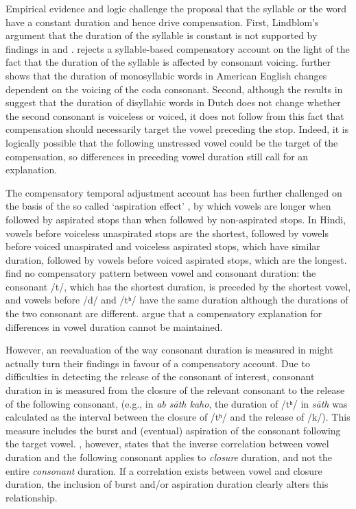 \documentclass[preprint]{JASAnew}
\begin{document}
Empirical evidence and logic challenge the proposal that the syllable or
the word have a constant duration and hence drive compensation. First,
Lindblom's \citeyearpar{lindblom1967} argument that the duration of the
syllable is constant is not supported by findings in \citet{chen1970}
and \citet{jacewicz2009}. \citet{chen1970} rejects a syllable-based
compensatory account on the light of the fact that the duration of the
syllable is affected by consonant voicing. \citet{jacewicz2009} further
shows that the duration of monosyllabic words in American English
changes dependent on the voicing of the coda consonant. Second, although
the results in \citet{slis1969} suggest that the duration of disyllabic
words in Dutch does not change whether the second consonant is voiceless
or voiced, it does not follow from this fact that compensation should
necessarily target the vowel preceding the stop. Indeed, it is logically
possible that the following unstressed vowel could be the target of the
compensation, so differences in preceding vowel duration still call for
an explanation.

The compensatory temporal adjustment account has been further challenged
on the basis of the so called `aspiration effect' \citep{maddieson1976},
by which vowels are longer when followed by aspirated stops than when
followed by non-aspirated stops. In Hindi, vowels before voiceless
unaspirated stops are the shortest, followed by vowels before voiced
unaspirated and voiceless aspirated stops, which have similar duration,
followed by vowels before voiced aspirated stops, which are the longest.
\citet{maddieson1976} find no compensatory pattern between vowel and
consonant duration: the consonant /t/, which has the shortest duration,
is preceded by the shortest vowel, and vowels before /d/ and /tʰ/ have
the same duration although the durations of the two consonant are
different. \citet{maddieson1976} argue that a compensatory explanation
for differences in vowel duration cannot be maintained.

However, an reevaluation of the way consonant duration is measured in
\citet{maddieson1976} might actually turn their findings in favour of a
compensatory account. Due to difficulties in detecting the release of
the consonant of interest, consonant duration in \citet{maddieson1976}
is measured from the closure of the relevant consonant to the release of
the following consonant, (e.g., in \emph{ab sāth kaho}, the duration of
/tʰ/ in \emph{sāth} was calculated as the interval between the closure
of /tʰ/ and the release of /k/). This measure includes the burst and
(eventual) aspiration of the consonant following the target vowel.
\citet{slis1969a}, however, states that the inverse correlation between
vowel duration and the following consonant applies to \emph{closure}
duration, and not the entire \emph{consonant} duration. If a correlation
exists between vowel and closure duration, the inclusion of burst and/or
aspiration duration clearly alters this relationship.
\end{document}
